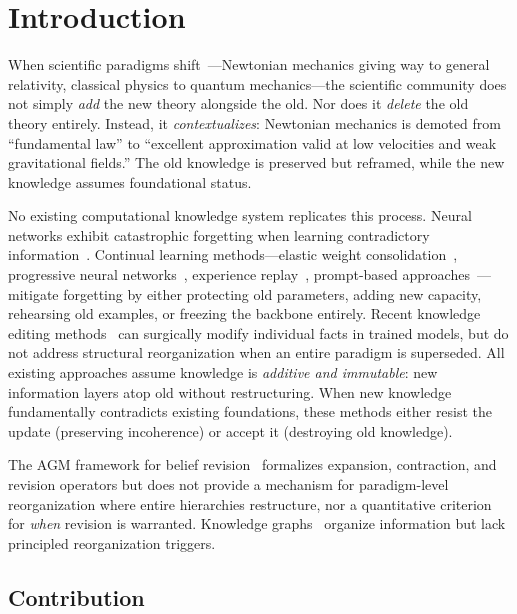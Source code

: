 \documentclass[11pt,a4paper]{article}
\theoremstyle{definition}
\begin{document}
\section{Introduction}\label{sec:intro}

When scientific paradigms shift~\citep{kuhn1962structure}---Newtonian mechanics giving
way to general relativity, classical physics to quantum mechanics---the scientific
community does not simply \emph{add} the new theory alongside the old. Nor does it
\emph{delete} the old theory entirely. Instead, it \emph{contextualizes}: Newtonian
mechanics is demoted from ``fundamental law'' to ``excellent approximation valid at low
velocities and weak gravitational fields.'' The old knowledge is preserved but reframed,
while the new knowledge assumes foundational status.

No existing computational knowledge system replicates this process. Neural networks
exhibit catastrophic forgetting when learning contradictory information~\citep{mccloskey1989catastrophic}.
Continual learning methods---elastic weight consolidation~\citep{kirkpatrick2017overcoming},
progressive neural networks~\citep{rusu2016progressive}, experience
replay~\citep{chaudhry2019tiny}, prompt-based approaches~\citep{wang2022learning}---mitigate
forgetting by either protecting old parameters, adding new capacity, rehearsing old
examples, or freezing the backbone entirely. Recent knowledge editing
methods~\citep{meng2022locating,meng2023memit,mitchell2022mend} can surgically modify
individual facts in trained models, but do not address structural reorganization when
an entire paradigm is superseded. All existing approaches assume knowledge is
\emph{additive and immutable}: new information layers atop old without restructuring.
When new knowledge fundamentally contradicts existing foundations, these methods either
resist the update (preserving incoherence) or accept it (destroying old knowledge).

The AGM framework for belief revision~\citep{alchourron1985logic} formalizes expansion,
contraction, and revision operators but does not provide a mechanism for paradigm-level
reorganization where entire hierarchies restructure, nor a quantitative criterion for
\emph{when} revision is warranted. Knowledge graphs~\citep{bordes2013translating,speer2017conceptnet}
organize information but lack principled reorganization triggers.

\subsection{Contribution}
\end{document}

